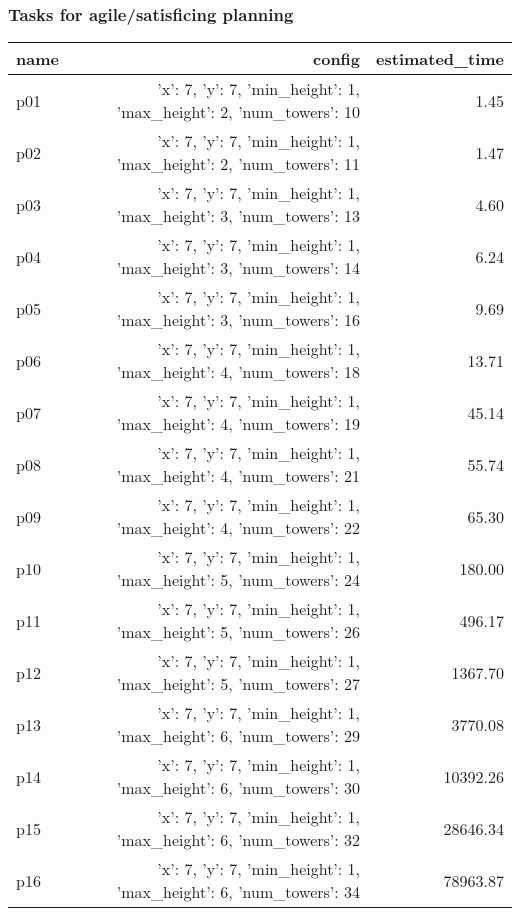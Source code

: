 \documentclass{article}
\begin{document}
                                \subsubsection*{Tasks for agile/satisficing planning}
                                
                            \begin{center}
                            \scriptsize
                            \begin{tabular}{@{}l|r|r@{}}
                            name & config & estimated\_time\\\midrule
                              p01&{'x': 7, 'y': 7, 'min\_height': 1, 'max\_height': 2, 'num\_towers': 10}&1.45\\
  p02&{'x': 7, 'y': 7, 'min\_height': 1, 'max\_height': 2, 'num\_towers': 11}&1.47\\
  p03&{'x': 7, 'y': 7, 'min\_height': 1, 'max\_height': 3, 'num\_towers': 13}&4.60\\
  p04&{'x': 7, 'y': 7, 'min\_height': 1, 'max\_height': 3, 'num\_towers': 14}&6.24\\
  p05&{'x': 7, 'y': 7, 'min\_height': 1, 'max\_height': 3, 'num\_towers': 16}&9.69\\
  p06&{'x': 7, 'y': 7, 'min\_height': 1, 'max\_height': 4, 'num\_towers': 18}&13.71\\
  p07&{'x': 7, 'y': 7, 'min\_height': 1, 'max\_height': 4, 'num\_towers': 19}&45.14\\
  p08&{'x': 7, 'y': 7, 'min\_height': 1, 'max\_height': 4, 'num\_towers': 21}&55.74\\
  p09&{'x': 7, 'y': 7, 'min\_height': 1, 'max\_height': 4, 'num\_towers': 22}&65.30\\
  p10&{'x': 7, 'y': 7, 'min\_height': 1, 'max\_height': 5, 'num\_towers': 24}&180.00\\
  p11&{'x': 7, 'y': 7, 'min\_height': 1, 'max\_height': 5, 'num\_towers': 26}&496.17\\
  p12&{'x': 7, 'y': 7, 'min\_height': 1, 'max\_height': 5, 'num\_towers': 27}&1367.70\\
  p13&{'x': 7, 'y': 7, 'min\_height': 1, 'max\_height': 6, 'num\_towers': 29}&3770.08\\
  p14&{'x': 7, 'y': 7, 'min\_height': 1, 'max\_height': 6, 'num\_towers': 30}&10392.26\\
  p15&{'x': 7, 'y': 7, 'min\_height': 1, 'max\_height': 6, 'num\_towers': 32}&28646.34\\
  p16&{'x': 7, 'y': 7, 'min\_height': 1, 'max\_height': 6, 'num\_towers': 34}&78963.87\\

\end{tabular}
\end{center}
\end{document}

